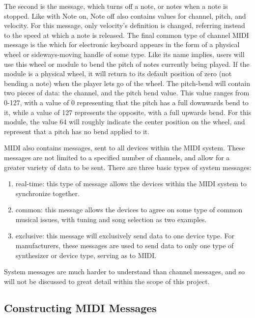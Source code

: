 The second is the  message, which turns off a note, or notes when a note is stopped. Like with Note on, Note off also contains values for channel, pitch, and velocity. For this message, only velocity's definition is changed, referring instead to the speed at which a note is released. The final common type of channel MIDI message is the  which for electronic keyboard appears in the form of a physical wheel or sideways-moving handle of some type. Like its name implies, users will use this wheel or module to bend the pitch of notes currently being played. If the module is a physical wheel, it will return to its default position of zero (not bending a note) when the player lets go of the wheel. The pitch-bend will contain two pieces of data: the channel, and the pitch bend value. This value ranges from 0-127, with a value of 0 representing that the pitch has a full downwards bend to it, while a value of 127 represents the opposite, with a full upwards bend\cite{Kirk_Hunt_2013}. For this module, the value 64 will roughly indicate the center position on the wheel, and represent that a pitch has no bend applied to it.

MIDI also contains  messages, sent to all devices within the MIDI system\cite{Romano_2003}. These messages are not limited to a specified number of channels, and allow for a greater variety of data to be sent. There are three basic types of system messages\cite{Kirk_Hunt_2013}:

\begin{enumerate}
	\item real-time: this type of message allows the devices within the MIDI system to synchronize together.
	\item common: this message allows the devices to agree on some type of common musical issues, with tuning and song selection as two examples.
	\item exclusive: this message will exclusively send data to one device type. For manufacturers, these messages are used to send data to only one type of synthesizer or device type, serving as  to MIDI.
\end{enumerate}

\noindent System messages are much harder to understand than channel messages, and so will not be discussed to great detail within the scope of this project.

\subsection[Constructing MIDI Messages]{Constructing MIDI Messages}\label{section:midi-messages}

